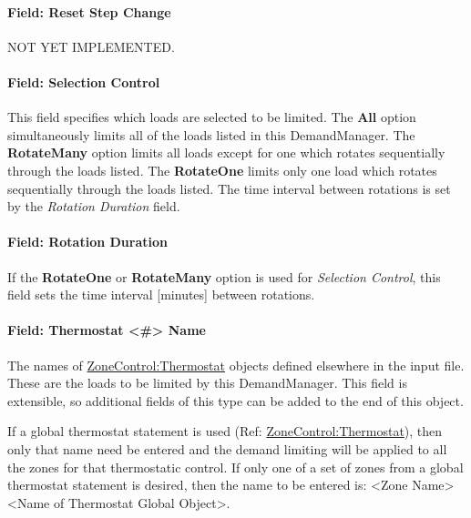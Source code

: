 \paragraph{Field: Reset Step Change}\label{field-reset-step-change}

NOT YET IMPLEMENTED.

\paragraph{Field: Selection Control}\label{field-selection-control-3}

This field specifies which loads are selected to be limited. The \textbf{All} option simultaneously limits all of the loads listed in this DemandManager. The \textbf{RotateMany} option limits all loads except for one which rotates sequentially through the loads listed. The \textbf{RotateOne} limits only one load which rotates sequentially through the loads listed. The time interval between rotations is set by the \emph{Rotation Duration} field.

\paragraph{Field: Rotation Duration}\label{field-rotation-duration-3}

If the \textbf{RotateOne} or \textbf{RotateMany} option is used for \emph{Selection Control}, this field sets the time interval {[}minutes{]} between rotations.

\paragraph{Field: Thermostat \textless{}\#\textgreater{} Name}\label{field-thermostat-1-10-name}

The names of \hyperref[zonecontrolthermostat]{ZoneControl:Thermostat} objects defined elsewhere in the input file. These are the loads to be limited by this DemandManager.  This field is extensible, so additional fields of this type can be added to the end of this object.

If a global thermostat statement is used (Ref: \hyperref[zonecontrolthermostat]{ZoneControl:Thermostat}), then only that name need be entered and the demand limiting will be applied to all the zones for that thermostatic control. If only one of a set of zones from a global thermostat statement is desired, then the name to be entered is: \textless{}Zone Name\textgreater{} \textless{}Name of Thermostat Global Object\textgreater{}.

